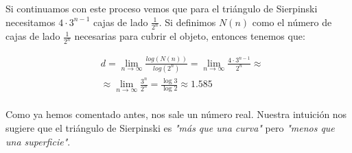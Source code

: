 \noindent Si continuamos con este proceso vemos que para el triángulo de Sierpinski necesitamos $4 \cdot 3^{n-1}$ cajas de lado $\frac{1}{2^n}$.
Si definimos $N(n)$ como el número de cajas de lado $\frac{1}{2^n}$ necesarias para cubrir el objeto, entonces tenemos que:

\begin{equation}
    \begin{split}
        & d = \lim_{n \rightarrow \infty} \frac{log (N(n))}{log (2^n)} = \lim_{n \rightarrow \infty} \frac{4 \cdot 3^{n-1}}{2^n} \approx \\
        & \approx \lim_{n \rightarrow \infty} \frac{3^n}{2^n} = \frac{\log{3}}{\log{2}} \approx 1.585\\
    \end{split}
\end{equation}

\noindent Como ya hemos comentado antes, nos sale un número real. Nuestra intuición nos sugiere que el triángulo de Sierpinski es \textit{"más que una curva"} pero \textit{"menos que una superficie"}. \cite{Atencia_2014}\\
